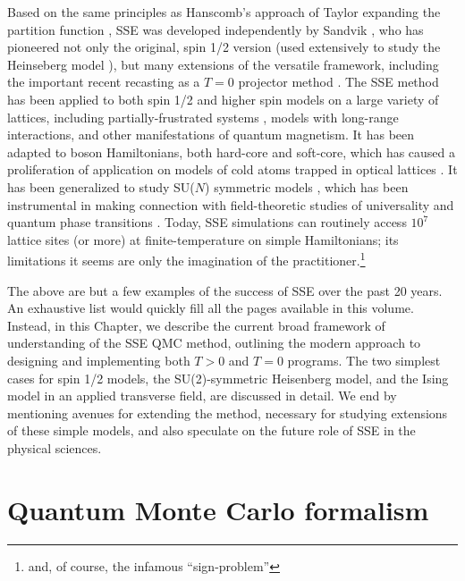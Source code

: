 \documentclass[vecphys]{svmult}
\begin{document}
Based on the same principles as Hanscomb's approach of Taylor expanding the partition function \cite{Melko:Handscomb62}, SSE was developed independently by Sandvik \cite{Melko:Sandvik91,Melko:Sandvik92}, who has pioneered not only the original, spin 1/2 version (used extensively to study the Heinseberg model \cite{Melko:SandvikHeis}), but many extensions of the versatile framework, including the important recent recasting as a $T=0$ projector method \cite{Melko:Sandvik05,Melko:Beach06}.  The SSE method has been applied to both spin 1/2 and higher spin models \cite{Melko:Kawashima94,Melko:HK} on a large variety of lattices, including partially-frustrated systems \cite{Melko:Melko07}, models with long-range interactions, and other manifestations of quantum magnetism.  It has been adapted to boson Hamiltonians, both hard-core and soft-core, which has caused a proliferation of application on models of cold atoms trapped in optical lattices \cite{Melko:Wessel04}.  It has been generalized to study SU($N$) symmetric models \cite{Melko:harada2003:sun,Melko:Kawashima07}, which has been instrumental in making connection with field-theoretic studies of universality and quantum phase transitions \cite{Melko:kaul2011:j1j2}.  Today, SSE simulations can routinely access $10^7$ lattice sites (or more) at finite-temperature on simple Hamiltonians;  its limitations it seems are only the imagination of the practitioner.\footnote{and, of course, the infamous ``sign-problem''}

The above are but a few examples of the success of SSE over the past 20 years.  An exhaustive list would quickly fill all the pages available in this volume.  Instead, in this Chapter, we describe the current broad framework of understanding of the SSE QMC method, outlining the modern approach to designing and implementing both $T>0$ and $T=0$ programs.  The two simplest cases for spin 1/2 models, the SU(2)-symmetric Heisenberg model, and the Ising model in an applied transverse field, are discussed in detail.  We end by mentioning avenues for extending the method, necessary for studying extensions of these simple models, and also speculate on the future role of SSE in the physical sciences.

\section{Quantum Monte Carlo formalism}
\end{document}
